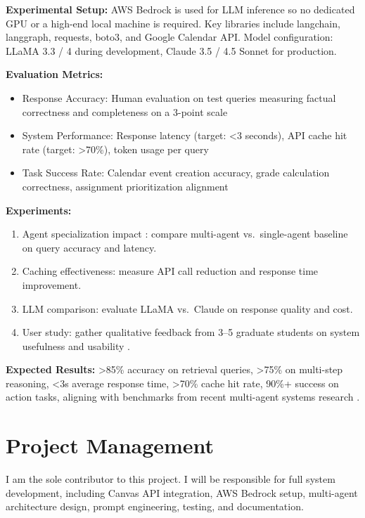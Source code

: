 \documentclass{article}
\begin{document}
\textbf{Experimental Setup:} AWS Bedrock is used for LLM inference so no dedicated GPU or a high-end local machine is required. Key libraries include langchain, langgraph, requests, boto3, and Google Calendar API. Model configuration: LLaMA 3.3 / 4 during development, Claude 3.5 / 4.5 Sonnet for production.

\textbf{Evaluation Metrics:}

\begin{itemize}
\item Response Accuracy: Human evaluation on test queries measuring factual correctness and completeness on a 3-point scale
\item System Performance: Response latency (target: <3 seconds), API cache hit rate (target: >70\%), token usage per query
\item Task Success Rate: Calendar event creation accuracy, grade calculation correctness, assignment prioritization alignment
\end{itemize}
\textbf{Experiments:}
\begin{enumerate}
\item Agent specialization impact \cite{wang2025megaagent}: compare multi-agent vs.\ single-agent baseline on query accuracy and latency.
\item Caching effectiveness: measure API call reduction and response time improvement.
\item LLM comparison: evaluate LLaMA vs.\ Claude on response quality and cost.
\item User study: gather qualitative feedback from 3--5 graduate students on system usefulness and usability \cite{teachable2025agents, genai2024higher}.
\end{enumerate}

\textbf{Expected Results:} >85\% accuracy on retrieval queries, >75\% on multi-step reasoning, <3s average response time, >70\% cache hit rate, 90\%+ success on action tasks, aligning with benchmarks from recent multi-agent systems research \cite{resilience2025multiagent, autoscaling2025mas}.

\section{Project Management}
I am the sole contributor to this project. I will be responsible for full system development, including Canvas API integration, AWS Bedrock setup, multi-agent architecture design, prompt engineering, testing, and documentation.
\end{document}

